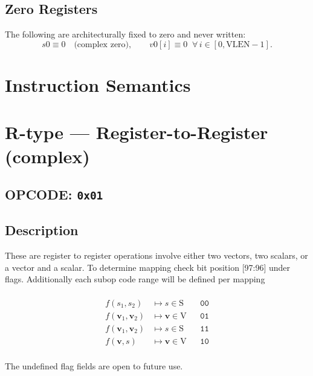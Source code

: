 \documentclass[10pt]{article}
\begin{document}
\subsection*{Zero Registers}
\noindent The following are architecturally fixed to zero and never written:
\[
s0 \equiv 0\quad\text{(complex zero)}, \qquad
v0[i] \equiv 0\;\; \forall\, i \in [0,\mathrm{VLEN}-1].
\]

\clearpage
\section*{Instruction Semantics}

\section*{R-type — Register-to-Register (complex)}
\subsection*{OPCODE: \texttt{0x01}}
\subsection*{Description}


These are register to register operations involve either two vectors, two scalars, or a vector and a scalar. To determine mapping check bit position [97:96] under flags. Additionally each subop code range will be defined per mapping\\\\

\[
\begin{aligned}
f(s_1,s_2)                 &\mapsto s \in \mathrm{S}            && \texttt{00} \\
f(\mathbf v_1,\mathbf v_2) &\mapsto \mathbf v \in \mathrm{V}    && \texttt{01} \\
f(\mathbf v_1,\mathbf v_2)             &\mapsto s \in \mathrm{S}            && \texttt{11} \\
f(\mathbf v,s)             &\mapsto \mathbf v \in \mathrm{V}    && \texttt{10} \\
\end{aligned}
\]



The undefined flag fields are open to future use. 
\end{document}
